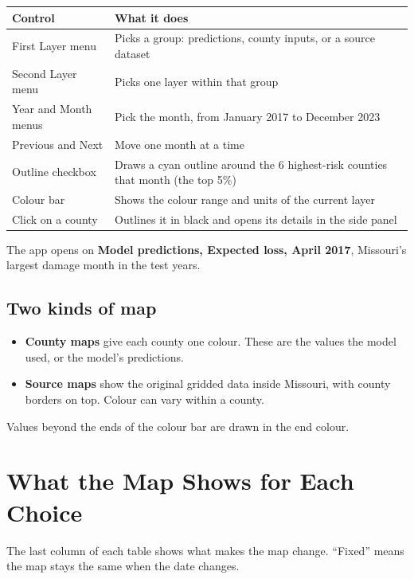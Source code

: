 \documentclass[11pt]{article}
\begin{document}
\begin{table}[H]
\centering
\small
\begin{tabularx}{\textwidth}{lY}
\toprule
\textbf{Control} & \textbf{What it does} \\
\midrule
First Layer menu & Picks a group: predictions, county inputs, or a source dataset \\
Second Layer menu & Picks one layer within that group \\
Year and Month menus & Pick the month, from January 2017 to December 2023 \\
Previous and Next & Move one month at a time \\
Outline checkbox & Draws a cyan outline around the 6 highest-risk counties that month (the top 5\%) \\
Colour bar & Shows the colour range and units of the current layer \\
Click on a county & Outlines it in black and opens its details in the side panel \\
\bottomrule
\end{tabularx}
\end{table}

The app opens on \textbf{Model predictions, Expected loss, April 2017}, Missouri's largest damage
month in the test years.

\subsection*{Two kinds of map}

\begin{itemize}
  \item \textbf{County maps} give each county one colour. These are the values the model used,
        or the model's predictions.
  \item \textbf{Source maps} show the original gridded data inside Missouri, with county borders
        on top. Colour can vary within a county.
\end{itemize}

Values beyond the ends of the colour bar are drawn in the end colour.

\section{What the Map Shows for Each Choice}

The last column of each table shows what makes the map change. ``Fixed'' means the map stays the
same when the date changes.
\end{document}
